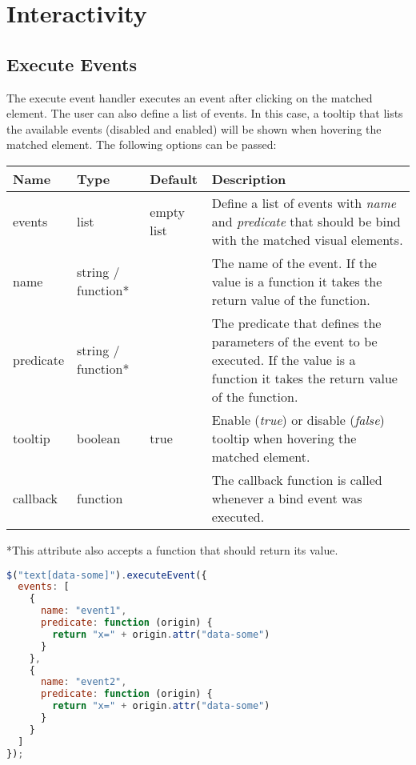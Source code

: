 \pagebreak

\section{Interactivity}
\label{sec:interactivity}

\subsection{Execute Events}
\label{sec:execute_events}

The execute event handler executes an event after clicking on the matched element.
The user can also define a list of events.
In this case, a tooltip that lists the available events (disabled and enabled) will be shown when hovering the matched element.
The following options can be passed:

\vspace{0.5cm}
\begin{tabular}{ l l l p{7cm} }
  \textbf{Name} & \textbf{Type} & \textbf{Default} & \textbf{Description} \\
  \hline\noalign{\medskip}
  events & list & empty list & Define a list of events with \textit{name} and \textit{predicate} that should be bind with the matched visual elements. \\
  \hline\noalign{\medskip}
  \hspace{0.5cm} name & string / function* & & The name of the event. If the value is a function it takes the return value of the function.\\
  \hline\noalign{\medskip}
  \hspace{0.5cm}  predicate & string / function* & & The predicate that defines the parameters of the event to be executed. If the value is a function it takes the return value of the function.\\
  \hline\noalign{\medskip}
  tooltip & boolean & true & Enable (\textit{true}) or disable (\textit{false}) tooltip when hovering the matched element.\\
  \hline\noalign{\medskip}
  callback & function &  & The callback function is called whenever a bind event was executed.
\end{tabular}

*This attribute also accepts a function that should return its value.

\begin{lstlisting}[float=ht!,language=JavaScript]
$("text[data-some]").executeEvent({
  events: [
    { 
      name: "event1", 
      predicate: function (origin) {
        return "x=" + origin.attr("data-some") 
      }
    },
    {
      name: "event2", 
      predicate: function (origin) {
        return "x=" + origin.attr("data-some")
      }
    } 
  ]
});
\end{lstlisting}

